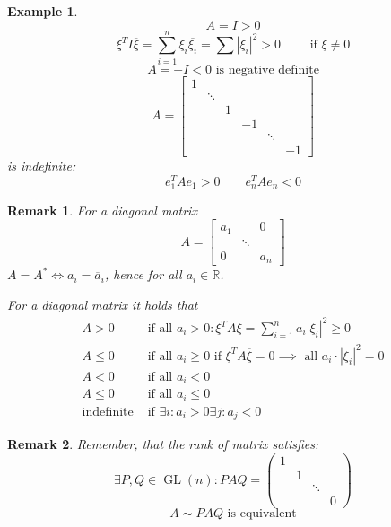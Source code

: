 \documentclass{article}
\newtheorem{example}{Example}  \numberwithin{example}{section}
\newtheorem{remark}{Remark}  \numberwithin{remark}{section}
\newcommand{\card}[1]{\left|#1\right|}
\begin{document}
\begin{example}
  \[ A = I > 0 \]
  \[ \xi^T I \overline{\xi} = \sum_{i=1}^n \xi_i \overline{\xi_i} = \sum \card{\xi_i}^2 > 0 \qquad \text{ if } \xi \neq 0 \]
  \[ A = -I < 0 \text{ is negative definite} \]
  \[
    A = \begin{bmatrix}
      1 &        &   &    &        & \\
        & \ddots &   &    &        & \\
        &        & 1 &    &        & \\
        &        &   & -1 &        & \\
        &        &   &    & \ddots & \\
        &        &   &    &        & -1
    \end{bmatrix}
  \]
  is indefinite:
  \[ e_1^T A e_1 > 0 \qquad e_n^T A e_n < 0 \]
\end{example}

\begin{remark}
  For a diagonal matrix
  \[ A = \begin{bmatrix} a_1 &  & 0 \\ & \ddots & \\ 0 &  & a_n \end{bmatrix} \]
  $A = A^* \iff a_i = \overline{a}_i$, hence for all $a_i \in \mathbb R$.

  For a diagonal matrix it holds that
  \begin{align*}
    A > 0 & \text{ if all } a_i > 0: \xi^T A \overline{\xi} = \sum_{i=1}^n a_i \card{\xi_i}^2 \geq 0 \\
    A \leq 0 & \text{ if all } a_i \geq 0 \text{ if } \xi^T A \overline{\xi} = 0 \implies \text{ all } a_i \cdot \card{\xi_i}^2 = 0 \\
    A < 0 & \text{ if all } a_i < 0 \\
    A \leq 0 & \text{ if all } a_i \leq 0 \\
    \text{indefinite} & \text{ if } \exists i: a_i > 0 \exists j: a_j < 0
  \end{align*}
\end{remark}

\begin{remark}
  Remember, that the rank of matrix satisfies:
  \[ \exists P,Q \in \operatorname{GL}(n): PAQ = \begin{pmatrix} 1 & & & \\ & 1 & & \\ & & \ddots & \\ & & & 0 \end{pmatrix} \]
  \[ A \sim PAQ \text{ is equivalent} \]
\end{remark}
\end{document}
